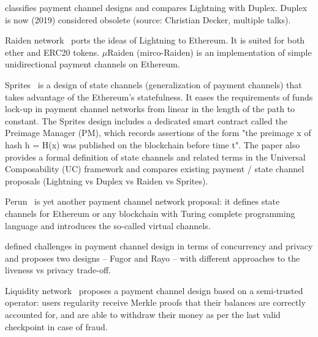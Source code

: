 \cite{DBLP:journals/iacr/McCorryMSH16} classifies payment channel designs and compares Lightning with Duplex.
Duplex is now (2019) considered obsolete (source: Christian Decker, multiple talks).

Raiden network~\cite{Raiden} ports the ideas of Lightning to Ethereum.
It is suited for both ether and ERC20 tokens.
$\mu$Raiden (mirco-Raiden) is an implementation of simple unidirectional payment channels on Ethereum.

Sprites~\cite{DBLP:journals/corr/MillerBKM17} is a design of state channels (generalization of payment channels) that takes advantage of the Ethereum’s statefulness.
It eases the requirements of funds lock-up in payment channel networks from linear in the length of the path to constant.
The Sprites design includes a dedicated smart contract called the Preimage Manager (PM), which records assertions of the form "the preimage x of hash h = H(x) was published on the blockchain before time t".
The paper also provides a formal definition of state channels and related terms in the Universal Composability (UC) framework and compares existing payment / state channel proposals (Lightning vs Duplex vs Raiden vs Sprites).

Perun~\cite{DBLP:journals/iacr/DziembowskiEFM17} is yet another payment channel network proposal: it defines state channels for Ethereum or any blockchain with Turing complete programming language and introduces the so-called virtual channels.

\cite{DBLP:journals/iacr/MalavoltaMKMR17} defined challenges in payment channel design in terms of concurrency and privacy and proposes two designs -- Fugor and Rayo -- with different approaches to the liveness vs privacy trade-off.

Liquidity network~\cite{Liquidity} proposes a payment channel design based on a semi-trusted operator: users regularity receive Merkle proofs that their balances are correctly accounted for, and are able to withdraw their money as per the last valid checkpoint in case of fraud.